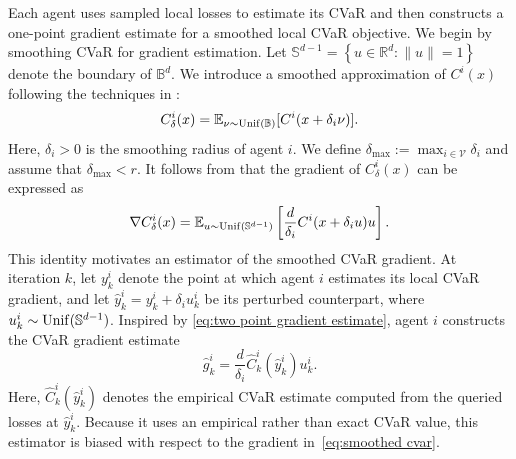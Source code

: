 \documentclass[twocolumn]{autart}    %
\newcommand{\crk}[1]{\left\{#1\right\}}
\newcommand{\1}{\mathbf{1}}
\begin{document}
Each agent uses sampled local losses to estimate its CVaR and then constructs a one-point gradient estimate for a smoothed local CVaR objective. 
We begin by smoothing CVaR for gradient estimation.
 Let $\mathbb{S}^{d-1} = \crk{u \in \mathbb{R}^d: \| u\| =1}$ denote the boundary of $\mathbb{B}^d$. We introduce a smoothed approximation of $C^i(x)$ following the techniques in \cite{flaxman2004online}:
\begin{equation}\label{eq:smoothed cvar}
    C_\delta^i(x) = \mathbb{E}_{\nu \sim {\rm Unif}(\mathbb{B})}[C^i(x+\delta_i \nu )].
\end{equation}   
Here, $\delta_i>0$ is the smoothing radius of agent $i$. We define $\delta_{\max}:=\max_{i\in\mathcal V}\delta_i$ and assume that $\delta_{\max}<r$.
It follows from \cite{duchi2015optimal} that the gradient of $C_\delta^i(x)$ can be expressed as
\begin{equation}\label{eq:two point gradient estimate}
    \nabla C_\delta^i(x) = \mathbb{E}_{u\sim {\rm Unif}(\mathbb{S}^{d-1})}\left[\frac{d}{\delta_i} C^i(x+\delta_i u ) u\right].
\end{equation}
This identity motivates an estimator of the smoothed
CVaR gradient. 
At iteration $k$, let $y_k^i$ denote the point at which agent $i$
estimates its local CVaR gradient, and let $\hat y_k^i = y_k^i+\delta_i u_k^i$ be its perturbed counterpart, where $u_k^i\sim {\rm Unif}(\mathbb{S}^{d-1})$.
Inspired by \eqref{eq:two point gradient estimate}, agent $i$ constructs
the CVaR gradient estimate
\begin{equation}\label{eq:estimated gradient}
    \hat{g}_k^i = \frac{d}{\delta_i}  \widehat{C}_k^i(\hat{y}_k^i)    u_k^i.
\end{equation} 
Here, 
$\widehat C_k^i(\hat y_k^i)$ denotes the empirical CVaR estimate
computed from the queried losses at $\hat{y}_k^i$. 
Because it uses an empirical rather than exact CVaR value, this estimator is biased with respect to the gradient in~\eqref{eq:smoothed cvar}.
\end{document}
